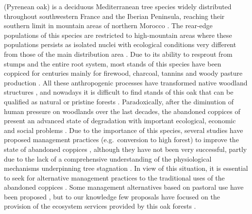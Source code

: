 \Qp (Pyrenean oak) is a deciduous Mediterranean tree species widely distributed throughout southwestern France and the Iberian Peninsula, reaching their southern limit in mountain areas of northern Morocco \autocite{Franco1990Quercus}. The rear-edge populations of this species are restricted to high-mountain areas where these populations persists as isolated nuclei with ecological conditions very different from those of the main distribution area \autocite{PerezLuqueetal2021EcologicalDiversity}. Due to its ability to resprout from stumps and the entire root system, most stands of this species have been coppiced for centuries mainly for firewood, charcoal, tannins and woody pasture production \autocite{SanchezPalomaresetal2008EstacionesEcologicas,XimenezdeEmbun1961MonteBajo}. All these anthropogenic processes have transformed native woodland structures \autocite{Tarregaetal2006ForestStructure}, and nowadays it is difficult to find stands of this oak that can be qualified as natural or pristine forests \autocite{RuizdelaTorre2006FloraMayor}. Paradoxically, after the diminution of human pressure on woodlands over the last decades, the abandoned coppices of \Qp present an advanced state of degradation with important ecological, economic and social problems \autocite{Bravoetal2008SelviculturaMontes,MontoyaMeson1979SituacionActual,Piqueetal2018Spain,PiqueVericat2015EvolutionPerspectives,Vericatetal2012GestionAdaptativa}. Due to the importance of this species, several studies have proposed management practices (e.g.~conversion to high forest) to improve the state of abandoned coppices \autocite{Bravoetal2008SelviculturaMontes,Montoya1982SelviculturaOrdenacion,Montoya1983UsosAlternativos,Serradaetal1992CoppiceSystem,Vericatetal2012GestionAdaptativa}, although they have not been very successful, partly due to the lack of a comprehensive understanding of the physiological mechanisms underpinning tree stagnation \autocite{Salomonetal2017GeneralFailure,ValbuenaCarabanaGil2017CentenaryCoppicing}. In view of this situation, it is essential to seek for alternative management practices to the traditional uses of the abandoned coppices \autocite{MesonMontoya1985VegetacionForestal,SanMigueletal2012BosquesMatorrales}. Some management alternatives based on pastoral use have been proposed \autocite{HerreraCalvo2016UsoPastoral}, but to our knowledge few proposals have focused on the provision of the ecosystem services provided by this oak forests \autocites[but see][]{Piqueetal2018Spain,PiqueVericat2015EvolutionPerspectives}.


